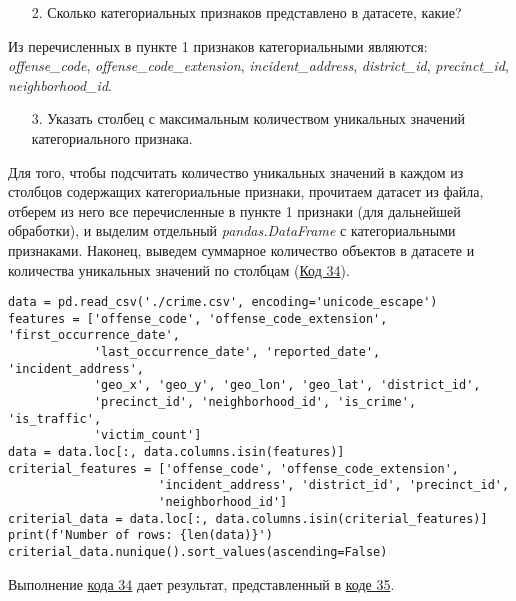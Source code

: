 \begin{enumerate}
    \item[2.] Сколько категориальных признаков представлено в датасете, какие?
\end{enumerate}

Из перечисленных в пункте 1 признаков категориальными являются: \textit{offense\_code}, \textit{offense\_code\_extension}, \textit{incident\_address}, \textit{district\_id}, \textit{precinct\_id}, \textit{neighborhood\_id}.

\begin{enumerate}
    \item[3.] Указать столбец с максимальным количеством уникальных значений категориального признака.
\end{enumerate}

Для того, чтобы подсчитать количество уникальных значений в каждом из столбцов содержащих категориальные признаки, прочитаем датасет из файла, отберем из него все перечисленные в пункте 1 признаки (для дальнейшей обработки), и выделим отдельный \textit{pandas.DataFrame} с категориальными признаками. Наконец, выведем суммарное количество объектов в датасете и количества уникальных значений по столбцам (\hyperref[code:34]{Код 34}).

\begin{code}
\begin{verbatim}
data = pd.read_csv('./crime.csv', encoding='unicode_escape')
features = ['offense_code', 'offense_code_extension', 'first_occurrence_date',
            'last_occurrence_date', 'reported_date', 'incident_address',
            'geo_x', 'geo_y', 'geo_lon', 'geo_lat', 'district_id',
            'precinct_id', 'neighborhood_id', 'is_crime', 'is_traffic',
            'victim_count']
data = data.loc[:, data.columns.isin(features)]
criterial_features = ['offense_code', 'offense_code_extension',
                     'incident_address', 'district_id', 'precinct_id',
                     'neighborhood_id']
criterial_data = data.loc[:, data.columns.isin(criterial_features)]
print(f'Number of rows: {len(data)}')
criterial_data.nunique().sort_values(ascending=False)
\end{verbatim}
\label{code:34}
\end{code}

Выполнение \hyperref[code:34]{кода 34} дает результат, представленный в \hyperref[code:35]{коде 35}.

